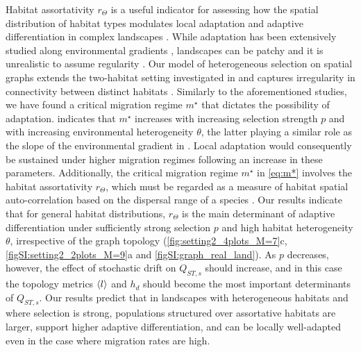 Habitat assortativity $r_\Theta$ is a useful indicator for assessing how the spatial distribution of habitat types modulates local adaptation and adaptive differentiation in complex landscapes \citep{Richardson2014}.
%
While adaptation has been extensively studied along
environmental gradients \citep{Slatkin1973,Slatkin1978,Kirkpatrick1997,Polechova2015,Polechova2018,AndradeRestrepo2019,Doebeli2003}, landscapes can be patchy and it is unrealistic to assume regularity \citep{Dale2010}.
%
Our model of heterogeneous selection on spatial graphs extends the two-habitat setting investigated in \citep{Meszena1997,Yeaman2011,Debarre2013,Mirrahimi2020} and captures irregularity in connectivity between distinct habitats \citep{Dale2010}.
% 
Similarly to the aforementioned studies, we have found a critical migration regime $m^\star$ that dictates the possibility of adaptation. 
 indicates that $m^\star$ increases with increasing selection strength $p$ and with increasing environmental heterogeneity $\theta$, the latter playing a similar role as the slope of the environmental gradient in \citep{Slatkin1973,Slatkin1978,Polechova2015,Polechova2018}. Local adaptation would consequently be sustained under higher migration regimes following an increase in these parameters.
%
Additionally, the critical migration regime $m^\star$ in \cref{eq:m*} involves the habitat assortativity $r_\Theta$, which must be regarded as a measure of habitat spatial auto-correlation based on the dispersal range of a species \citep{Richardson2014}. 
%
Our results indicate that for general habitat distributions, $r_\Theta$ is the main determinant of adaptive differentiation under sufficiently strong selection $p$ and high habitat heterogeneity $\theta$, irrespective of the graph topology (\cref{fig:setting2_4plots_M=7}c, \cref{figSI:setting2_2plots_M=9}a and \cref{figSI:graph_real_land}).
%
As $p$ decreases, however, the effect of stochastic drift on $Q_{ST,s}$ should increase, and in this case the topology metrics $\langle l \rangle$ and $h_d$ should become the most important determinants of $Q_{ST,s}$. 
%
Our results predict that in landscapes with heterogeneous habitats and where selection is strong, populations structured over assortative habitats are larger, support higher adaptive differentiation, and can be locally well-adapted even in the case where migration rates are high.

